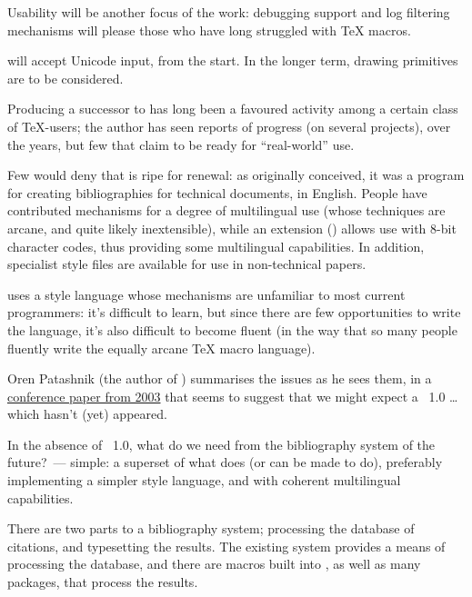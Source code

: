 Usability will be another focus of the work: debugging support and log
filtering mechanisms will please those who have long struggled with
\TeX{} macros.

\ExTeX{} will accept Unicode input, from the start.  In the longer
term, drawing primitives are to be considered.


Producing a successor to \BibTeX{} has long been a favoured activity
among a certain class of \TeX{}-users; the author has seen reports of
progress (on several projects), over the years, but few that claim to
be ready for ``real-world'' use.

Few would deny that \BibTeX{} is ripe for renewal: as originally
conceived, it was a program for creating bibliographies for technical
documents, in English.  People have contributed mechanisms for a
degree of multilingual use (whose techniques are arcane, and quite
likely inextensible), while an extension () allows
use with 8-bit character codes, thus providing some multilingual
capabilities.  In addition, specialist \BibTeX{} style files are
available for use in non-technical papers.

\BibTeX{} uses a style language whose mechanisms are unfamiliar to
most current programmers: it's difficult to learn, but since there are
few opportunities to write the language, it's also difficult to become
fluent (in the way that so many people fluently write the equally
arcane \TeX{} macro language).

Oren Patashnik (the author of \BibTeX{}) summarises the issues as he
sees them, in a %
\href{http://tug.org/TUGboat/Articles/tb24-1/patashnik.pdf}{ conference paper from 2003}
that seems to suggest that we might expect a
\BibTeX{}~1.0 \dots{} which hasn't (yet) appeared.

In the absence of \BibTeX{}~1.0, what do we need from the bibliography
system of the future?~--- simple: a superset of what \BibTeX{} does
(or can be made to do), preferably implementing a simpler style
language, and with coherent multilingual capabilities.

There are two parts to a bibliography system; processing the database
of citations, and typesetting the results.  The existing \bibtex{}
system provides a means of processing the database, and there are
macros built into \latex{}, as well as many \latex{} packages, that
process the results.


